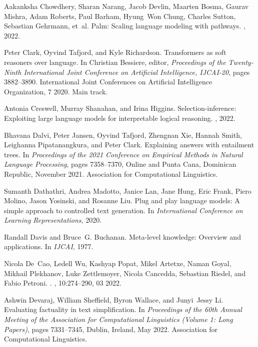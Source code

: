 \documentclass[11pt]{article}
\begin{document}
\begin{thebibliography}{100}
Aakanksha Chowdhery, Sharan Narang, Jacob Devlin, Maarten Bosma, Gaurav Mishra,
  Adam Roberts, Paul Barham, Hyung~Won Chung, Charles Sutton, Sebastian
  Gehrmann, et~al.
\newblock Palm: Scaling language modeling with pathways.
, 2022.

Peter Clark, Oyvind Tafjord, and Kyle Richardson.
\newblock Transformers as soft reasoners over language.
\newblock In Christian Bessiere, editor, {\em Proceedings of the Twenty-Ninth
  International Joint Conference on Artificial Intelligence, {IJCAI-20}}, pages
  3882--3890. International Joint Conferences on Artificial Intelligence
  Organization, 7 2020.
\newblock Main track.

Antonia Creswell, Murray Shanahan, and Irina Higgins.
\newblock Selection-inference: Exploiting large language models for
  interpretable logical reasoning.
, 2022.

Bhavana Dalvi, Peter Jansen, Oyvind Tafjord, Zhengnan Xie, Hannah Smith,
  Leighanna Pipatanangkura, and Peter Clark.
\newblock Explaining answers with entailment trees.
\newblock In {\em Proceedings of the 2021 Conference on Empirical Methods in
  Natural Language Processing}, pages 7358--7370, Online and Punta Cana,
  Dominican Republic, November 2021. Association for Computational Linguistics.

Sumanth Dathathri, Andrea Madotto, Janice Lan, Jane Hung, Eric Frank, Piero
  Molino, Jason Yosinski, and Rosanne Liu.
\newblock Plug and play language models: A simple approach to controlled text
  generation.
\newblock In {\em International Conference on Learning Representations}, 2020.

Randall Davis and Bruce~G. Buchanan.
\newblock Meta-level knowledge: Overview and applications.
\newblock In {\em IJCAI}, 1977.

Nicola De~Cao, Ledell Wu, Kashyap Popat, Mikel Artetxe, Naman Goyal, Mikhail
  Plekhanov, Luke Zettlemoyer, Nicola Cancedda, Sebastian Riedel, and Fabio
  Petroni.
.
,
  10:274--290, 03 2022.

Ashwin Devaraj, William Sheffield, Byron Wallace, and Junyi~Jessy Li.
\newblock Evaluating factuality in text simplification.
\newblock In {\em Proceedings of the 60th Annual Meeting of the Association for
  Computational Linguistics (Volume 1: Long Papers)}, pages 7331--7345, Dublin,
  Ireland, May 2022. Association for Computational Linguistics.


\end{thebibliography}
\end{document}
